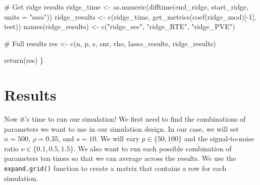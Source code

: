 \documentclass[
  letterpaper,
]{latex/krantz}
\makeatletter
\newenvironment{Shaded}{\begin{snugshade}}{\end{snugshade}}
\newcommand{\AttributeTok}[1]{\textcolor[rgb]{0.40,0.45,0.13}{#1}}
\newcommand{\CommentTok}[1]{\textcolor[rgb]{0.37,0.37,0.37}{#1}}
\newcommand{\DecValTok}[1]{\textcolor[rgb]{0.68,0.00,0.00}{#1}}
\newcommand{\FunctionTok}[1]{\textcolor[rgb]{0.28,0.35,0.67}{#1}}
\newcommand{\NormalTok}[1]{\textcolor[rgb]{0.00,0.23,0.31}{#1}}
\newcommand{\OtherTok}[1]{\textcolor[rgb]{0.00,0.23,0.31}{#1}}
\newcommand{\SpecialCharTok}[1]{\textcolor[rgb]{0.37,0.37,0.37}{#1}}
\newcommand{\StringTok}[1]{\textcolor[rgb]{0.13,0.47,0.30}{#1}}
\newenvironment{kframe}{%
\medskip{}
\setlength{\fboxsep}{.8em}
 \def\at@end@of@kframe{}%
 \ifinner\ifhmode%
  \def\at@end@of@kframe{\end{minipage}}%
  \begin{minipage}{\columnwidth}%
 \fi\fi%
 \def\FrameCommand##1{\hskip\@totalleftmargin \hskip-\fboxsep
 \colorbox{shadecolor}{##1}\hskip-\fboxsep
     \hskip-\linewidth \hskip-\@totalleftmargin \hskip\columnwidth}%
 \MakeFramed {\advance\hsize-\width
   \@totalleftmargin\z@ \linewidth\hsize
   \@setminipage}}%
 {\par\unskip\endMakeFramed%
 \at@end@of@kframe}
\renewenvironment{Shaded}{\begin{kframe}}{\end{kframe}}
\makeatother
\begin{document}
\begin{Shaded}
\begin{Highlighting}[]
  \CommentTok{\# Get ridge results}
\NormalTok{  ridge\_time }\OtherTok{\textless{}{-}} \FunctionTok{as.numeric}\NormalTok{(}\FunctionTok{difftime}\NormalTok{(end\_ridge, start\_ridge, }
                                    \AttributeTok{units =} \StringTok{"secs"}\NormalTok{))}
\NormalTok{  ridge\_results }\OtherTok{\textless{}{-}} \FunctionTok{c}\NormalTok{(ridge\_time, }
                     \FunctionTok{get\_metrics}\NormalTok{(}\FunctionTok{coef}\NormalTok{(ridge\_mod)[}\SpecialCharTok{{-}}\DecValTok{1}\NormalTok{], test))}
  \FunctionTok{names}\NormalTok{(ridge\_results) }\OtherTok{\textless{}{-}} \FunctionTok{c}\NormalTok{(}\StringTok{"ridge\_sec"}\NormalTok{, }\StringTok{"ridge\_RTE"}\NormalTok{, }\StringTok{"ridge\_PVE"}\NormalTok{)}
  
  \CommentTok{\# Full results}
\NormalTok{  res }\OtherTok{\textless{}{-}} \FunctionTok{c}\NormalTok{(n, p, s, snr, rho, lasso\_results, ridge\_results)}
  
  \FunctionTok{return}\NormalTok{(res)}
\NormalTok{\}}
\end{Highlighting}
\end{Shaded}

\section{Results}\label{results}

Now it's time to run our simulation! We first need to find the
combinations of parameters we want to use in our simulation design. In
our case, we will set \(n = 500\), \(\rho = 0.35\), and \(s = 10\). We
will vary \(p \in \{50, 100\}\) and the signal-to-noise ratio
\(\nu \in \{0.1, 0.5, 1.5\}\). We also want to run each possible
combination of parameters ten times so that we can average across the
results. We use the
\texttt{expand.grid()}
function to create a matrix that contains a row for each simulation.
\end{document}
